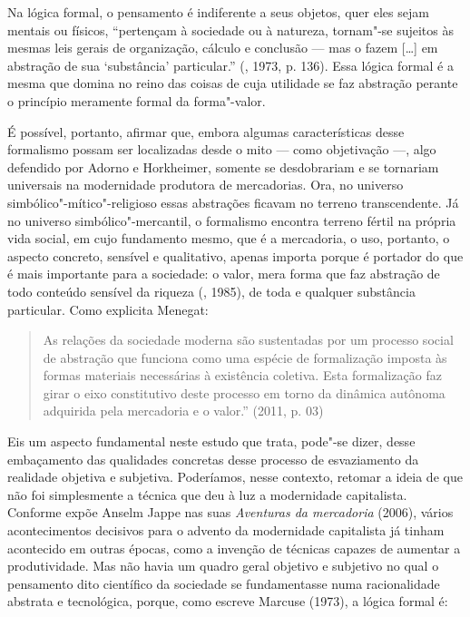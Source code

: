 Na lógica formal, o pensamento é indiferente a seus objetos, quer eles
sejam mentais ou físicos, ``pertençam à sociedade ou à natureza,
tornam"-se sujeitos às mesmas leis gerais de organização, cálculo e
conclusão --- mas o fazem [\ldots{}] em abstração de sua `substância'
particular.'' (, 1973, p. 136). Essa lógica formal
é a mesma que domina no reino das coisas de cuja
utilidade se faz abstração perante o princípio meramente formal da
forma"-valor.

É possível, portanto, afirmar que, embora algumas características desse
formalismo possam ser localizadas desde o mito --- como objetivação ---,
algo defendido por Adorno e Horkheimer, somente se desdobrariam e se
tornariam universais na modernidade produtora de mercadorias. Ora, no
universo simbólico"-mítico"-religioso essas abstrações ficavam no terreno
transcendente. Já no universo simbólico"-mercantil, o formalismo encontra
terreno fértil na própria vida social, em cujo fundamento mesmo, que é a
mercadoria, o uso, portanto, o aspecto concreto, sensível e qualitativo,
apenas importa porque é portador do que é mais importante para a
sociedade: o valor, mera forma que faz abstração de todo conteúdo
sensível da riqueza (, 1985), de toda e qualquer substância
particular. Como explicita Menegat:

\begin{quote}
As relações da sociedade moderna são sustentadas por um processo social
de abstração que funciona como uma espécie de formalização imposta às
formas materiais necessárias à existência coletiva. Esta formalização
faz girar o eixo constitutivo deste processo em torno da dinâmica
autônoma adquirida pela mercadoria e o valor.'' (2011, p. 03)
\end{quote}

Eis um aspecto fundamental neste estudo que trata, pode"-se dizer, desse
embaçamento das qualidades concretas desse
processo de esvaziamento da realidade objetiva e subjetiva. Poderíamos,
nesse contexto, retomar a ideia de que não foi simplesmente a técnica
que deu à luz a modernidade capitalista. Conforme expõe Anselm Jappe nas
suas \emph{Aventuras da mercadoria} (2006), vários acontecimentos
decisivos para o advento da modernidade capitalista já tinham acontecido
em outras épocas, como a invenção de técnicas capazes de aumentar a
produtividade. Mas não havia um quadro geral objetivo e subjetivo no
qual o pensamento dito científico da sociedade se fundamentasse numa
racionalidade abstrata e tecnológica, porque, como escreve Marcuse
(1973), a lógica formal é:

